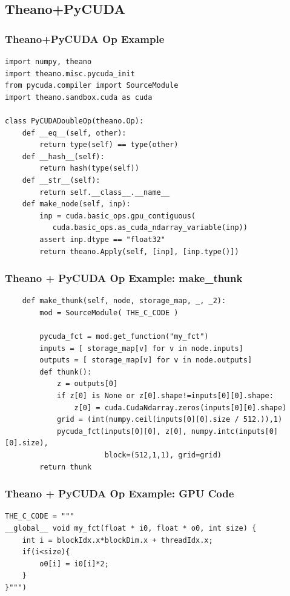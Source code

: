 \documentclass[a4paper,9pt]{beamer}
\begin{document}
\subsection{Theano+PyCUDA}
\begin{frame}[fragile]
\frametitle{Theano+PyCUDA Op Example}
\begin{Verbatim}
import numpy, theano
import theano.misc.pycuda_init
from pycuda.compiler import SourceModule
import theano.sandbox.cuda as cuda

class PyCUDADoubleOp(theano.Op):
    def __eq__(self, other):
        return type(self) == type(other)
    def __hash__(self):
        return hash(type(self))
    def __str__(self):
        return self.__class__.__name__
    def make_node(self, inp):
        inp = cuda.basic_ops.gpu_contiguous(
           cuda.basic_ops.as_cuda_ndarray_variable(inp))
        assert inp.dtype == "float32"
        return theano.Apply(self, [inp], [inp.type()])
\end{Verbatim}
\end{frame}


\begin{frame}[fragile]
\frametitle{Theano + PyCUDA Op Example: make\_thunk}
\begin{Verbatim}
    def make_thunk(self, node, storage_map, _, _2):
        mod = SourceModule( THE_C_CODE )

        pycuda_fct = mod.get_function("my_fct")
        inputs = [ storage_map[v] for v in node.inputs]
        outputs = [ storage_map[v] for v in node.outputs]
        def thunk():
            z = outputs[0]
            if z[0] is None or z[0].shape!=inputs[0][0].shape:
                z[0] = cuda.CudaNdarray.zeros(inputs[0][0].shape)
            grid = (int(numpy.ceil(inputs[0][0].size / 512.)),1)
            pycuda_fct(inputs[0][0], z[0], numpy.intc(inputs[0][0].size),
                       block=(512,1,1), grid=grid)
        return thunk
\end{Verbatim}
\end{frame}

\begin{frame}[fragile]
\frametitle{Theano + PyCUDA Op Example: GPU Code}
\begin{Verbatim}
THE_C_CODE = """
__global__ void my_fct(float * i0, float * o0, int size) {
    int i = blockIdx.x*blockDim.x + threadIdx.x;
    if(i<size){
        o0[i] = i0[i]*2;
    }
}""")
\end{Verbatim}
\end{frame}
\end{document}
